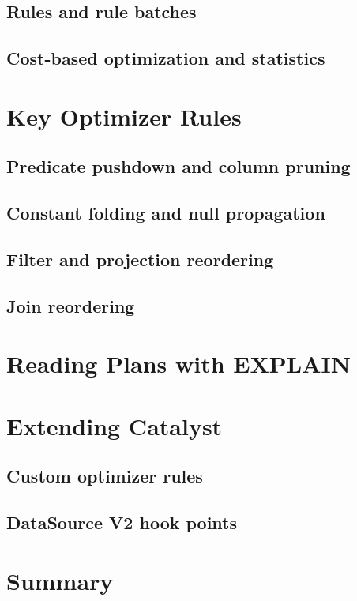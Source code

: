 \subsection{Rules and rule batches}
\tbd

\subsection{Cost-based optimization and statistics}
\tbd

\section{Key Optimizer Rules}
\label{sec:cat-rules}

\subsection{Predicate pushdown and column pruning}
\tbd

\subsection{Constant folding and null propagation}
\tbd

\subsection{Filter and projection reordering}
\tbd

\subsection{Join reordering}
\tbd

\section{Reading Plans with EXPLAIN}
\label{sec:cat-explain}
\tbd

\section{Extending Catalyst}
\label{sec:cat-extend}

\subsection{Custom optimizer rules}
\tbd

\subsection{DataSource V2 hook points}
\tbd

\section{Summary}
\tbd
